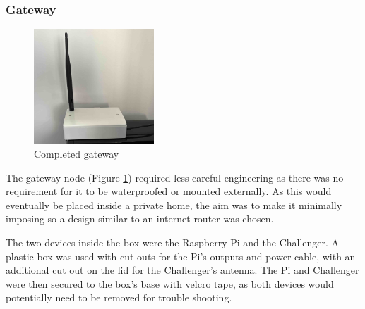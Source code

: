 \subsubsection{Gateway}

\begin{figure}[H]
    \centering
    \includegraphics[width=0.4\textwidth]{contents/part-2/fig2/gateway.jpeg}
    \caption{Completed gateway}
    \label{fig:gateway-final}
\end{figure}

The gateway node (Figure \ref{fig:gateway-final}) required less careful
engineering as there was no requirement for it to be waterproofed or mounted
externally. As this would eventually be placed inside a private home, the aim
was to make it minimally imposing so a design similar to an internet router was
chosen.

The two devices inside the box were the Raspberry Pi and the Challenger. A
plastic box was used with cut outs for the Pi's outputs and power cable, with an
additional cut out on the lid for the Challenger's antenna. The Pi and
Challenger were then secured to the box's base with velcro tape, as both devices
would potentially need to be removed for trouble shooting.
